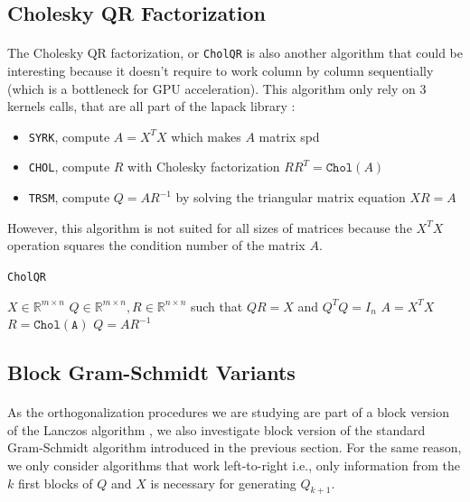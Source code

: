 \subsection{Cholesky QR Factorization}
\paragraph*{}
The Cholesky QR factorization, or \texttt{CholQR} is also another algorithm that could be interesting because it doesn't require to work column by column sequentially (which is a bottleneck for GPU acceleration). This algorithm only rely on 3 kernels calls, that are all part of the \acrshort{lapack} library :
\begin{itemize}
    \item \texttt{SYRK}, compute $A = X^TX$ which makes $A$ matrix \acrshort{spd}
    \item \texttt{CHOL}, compute $R$ with Cholesky factorization $RR^T=\mathtt{Chol}(A)$
    \item \texttt{TRSM}, compute $Q = AR^{-1}$ by solving the triangular matrix equation $XR=A$
\end{itemize}
However, this algorithm is not suited for all sizes of matrices because the $X^TX$ operation squares the condition number of the matrix $A$.

\begin{algorithm}
\caption{\texttt{CholQR}}\label{alg:cholqr}
\begin{algorithmic}[1]
\Require $X \in \mathbb{R}^{m\times n}$
\Ensure $ Q\in \mathbb{R}^{m\times n}, R \in \mathbb{R}^{n\times n}$ such that $QR = X$ and $Q^TQ=I_n$
\State $A = X^TX$
\State $R = \mathtt{Chol(A)}$ 
\State $Q = AR^{-1}$
\end{algorithmic}
\end{algorithm}




\subsection{Block Gram-Schmidt Variants}
\paragraph*{}
As the orthogonalization procedures we are studying are part of a block version of the Lanczos algorithm , we also investigate block version of the standard Gram-Schmidt algorithm introduced in the previous section. For the same reason, we only consider algorithms that work left-to-right i.e., only information from the $k$ first blocks of $Q$ and $X$ is necessary for generating $Q_{k+1}$.

